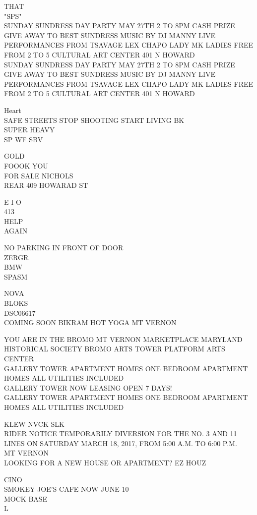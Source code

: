 \documentclass[10pt,letterpaper]{article}
\begin{document}
THAT\\
"SPS"\\
SUNDAY SUNDRESS DAY PARTY MAY 27TH 2 TO 8PM CASH PRIZE GIVE AWAY TO BEST SUNDRESS MUSIC BY DJ MANNY LIVE PERFORMANCES FROM TSAVAGE LEX CHAPO LADY MK LADIES FREE FROM 2 TO 5 CULTURAL ART CENTER 401 N HOWARD\\
SUNDAY SUNDRESS DAY PARTY MAY 27TH 2 TO 8PM CASH PRIZE GIVE AWAY TO BEST SUNDRESS MUSIC BY DJ MANNY LIVE PERFORMANCES FROM TSAVAGE LEX CHAPO LADY MK LADIES FREE FROM 2 TO 5 CULTURAL ART CENTER 401 N HOWARD

Heart\\
SAFE STREETS STOP SHOOTING START LIVING BK\\
SUPER HEAVY\\
SP WF SBV

GOLD\\
FOOOK YOU\\
FOR SALE NICHOLS\\
REAR 409 HOWARAD ST

E I O\\
413\\
HELP\\
AGAIN

NO PARKING IN FRONT OF DOOR\\
ZERGR\\
BMW\\
SPASM

NOVA\\
BLOKS\\
DSC06617\\
COMING SOON BIKRAM HOT YOGA MT VERNON

YOU ARE IN THE BROMO MT VERNON MARKETPLACE MARYLAND HISTORICAL SOCIETY BROMO ARTS TOWER PLATFORM ARTS CENTER\\
GALLERY TOWER APARTMENT HOMES ONE BEDROOM APARTMENT HOMES ALL UTILITIES INCLUDED\\
GALLERY TOWER NOW LEASING OPEN 7 DAYS!\\
GALLERY TOWER APARTMENT HOMES ONE BEDROOM APARTMENT HOMES ALL UTILITIES INCLUDED

KLEW NVCK SLK\\
RIDER NOTICE TEMPORARILY DIVERSION FOR THE NO. 3 AND 11 LINES ON SATURDAY MARCH 18, 2017, FROM 5:00 A.M. TO 6:00 P.M.\\
MT VERNON\\
LOOKING FOR A NEW HOUSE OR APARTMENT?  EZ HOUZ

CINO\\
SMOKEY JOE'S CAFE NOW JUNE 10\\
MOCK BASE\\
L
\end{document}
